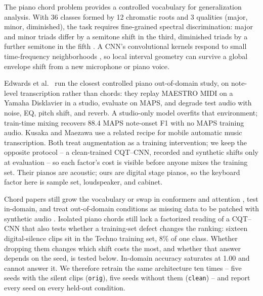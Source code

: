 \documentclass[pdflatex,sn-mathphys-num,iicol]{sn-jnl}
\begin{document}
The piano chord problem provides a controlled vocabulary for generalization analysis. With 36 classes formed by 12 chromatic roots and 3 qualities (major, minor, diminished), the task requires fine-grained spectral discrimination: major and minor triads differ by a semitone shift in the third, diminished triads by a further semitone in the fifth \cite{Harte2010}. A CNN's convolutional kernels respond to small time-frequency neighborhoods \cite{OShea2015,Purwono2022}, so local interval geometry can survive a global envelope shift from a new microphone or piano voice.

Edwards et al.\ \cite{Edwards2024} run the closest controlled piano out-of-domain study, on note-level transcription rather than chords: they replay MAESTRO MIDI on a Yamaha Disklavier in a studio, evaluate on MAPS, and degrade test audio with noise, EQ, pitch shift, and reverb. A studio-only model overfits that environment; train-time mixing recovers 88.4 MAPS note-onset F1 with no MAPS training audio. Kusaka and Maezawa \cite{Kusaka2024} use a related recipe for mobile automatic music transcription. Both treat augmentation as a training intervention; we keep the opposite protocol -- a clean-trained CQT--CNN, recorded and synthetic shifts only at evaluation -- so each factor's cost is visible before anyone mixes the training set. Their pianos are acoustic; ours are digital stage pianos, so the keyboard factor here is sample set, loudspeaker, and cabinet.

Chord papers still grow the vocabulary \cite{Majchrzak2025} or swap in conformers \cite{Akram2025} and attention \cite{Kusaka2024}, test in-domain, and treat out-of-domain conditions as missing data to be patched with synthetic audio \cite{Byambatsogt2020,Ostermann2023}. Isolated piano chords still lack a factorized reading of a CQT--CNN that also tests whether a training-set defect changes the ranking: sixteen digital-silence clips sit in the Techno training set, 8\% of one class. Whether dropping them changes which shift costs the most, and whether that answer depends on the seed, is tested below. In-domain accuracy saturates at 1.00 and cannot answer it. We therefore retrain the same architecture ten times -- five seeds with the silent clips (\texttt{orig}), five seeds without them (\texttt{clean}) -- and report every seed on every held-out condition.
\end{document}

